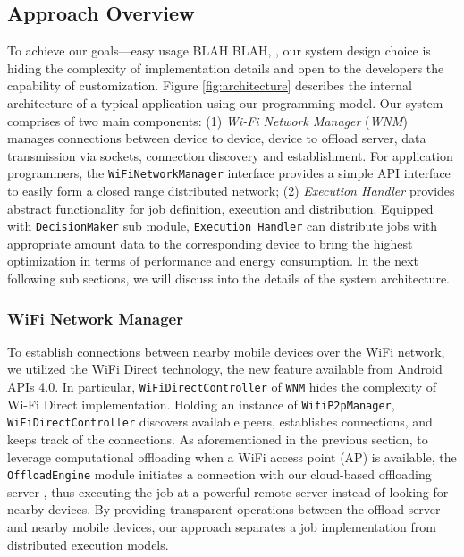 \documentclass[conference]{IEEEtran}
\begin{document}
\subsection{Approach Overview}
To achieve our goals---easy usage BLAH BLAH, , our system design choice is hiding the complexity of implementation details and open to the developers the capability of customization. Figure \ref{fig:architecture} describes the internal architecture of a typical application using our programming model. Our system comprises of two main components: (1) \emph{Wi-Fi Network Manager} (\emph{WNM}) manages connections between device to device, device to offload server, data transmission via sockets, connection discovery and establishment. For application programmers, the \texttt{WiFiNetworkManager} interface provides a simple API interface to easily form a closed range distributed network; (2) \emph{Execution Handler} provides abstract functionality for job definition, execution and distribution. Equipped with \texttt{DecisionMaker} sub module, \texttt{Execution Handler} can distribute jobs with appropriate amount data to the corresponding device to bring the highest optimization in terms of performance and energy consumption. In the next following sub sections, we will discuss into the details of the system architecture.

\subsubsection{WiFi Network Manager}
To establish connections between nearby mobile devices over the WiFi network, we utilized the WiFi Direct technology, the new feature available from Android APIs 4.0. In particular, \texttt{WiFiDirectController} of \texttt{WNM} hides the complexity of Wi-Fi Direct implementation. Holding an instance of \texttt{WifiP2pManager}, \texttt{WiFiDirectController} discovers available peers, establishes connections, and keeps track of the connections. As aforementioned in the previous section, to leverage computational offloading when a WiFi access point (AP) is available, the \texttt{OffloadEngine} module initiates a connection with our cloud-based offloading server \cite{kwon+:mobilesoft2015}, thus executing the job at a powerful remote server instead of looking for nearby devices. By providing transparent operations between the offload server and nearby mobile devices, our approach separates a job implementation from distributed execution models.
\end{document}
